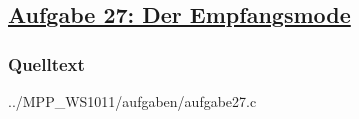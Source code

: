 \subsection
{\href{http://cst.mi.fu-berlin.de/intern/19606-P-MPP/Aufgaben/041101.html}
{Aufgabe 27: Der Empfangsmode}}

\subsubsection*{Quelltext}


{../MPP_WS1011/aufgaben/aufgabe27.c}
